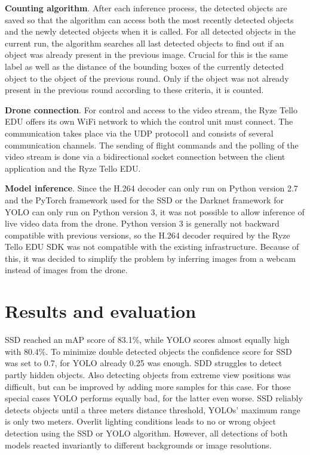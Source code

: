 \documentclass[a4paper, 10pt, journal]{wissarbIEEE}      %
\begin{document}
\textbf{Counting algorithm}. After each inference process, the detected objects are saved so that the algorithm can access both the most recently detected objects and the newly detected objects when it is called. For all detected objects in the current run, the algorithm searches all last detected objects to find out if an object was already present in the previous image. Crucial for this is the same label as well as the distance of the bounding boxes of the currently detected object to the object of the previous round. Only if the object was not already present in the previous round according to these criteria, it is counted.

\textbf{Drone connection}. For control and access to the video stream, the Ryze Tello EDU offers its own WiFi network to which the control unit must connect. The communication takes place via the UDP protocol1 and consists of several communication channels. The sending of flight commands and the polling of the video stream is done via a bidirectional socket connection between the client application and the Ryze Tello EDU.

\textbf{Model inference}. Since the H.264 decoder can only run on Python version 2.7 and the PyTorch framework used for the SSD or the Darknet framework for YOLO can only run on Python version 3, it was not possible to allow inference of live video data from the drone. Python version 3 is generally not backward compatible with previous versions, so the H.264 decoder required by the Ryze Tello EDU SDK was not compatible with the existing infrastructure. Because of this, it was decided to simplify the problem by inferring images from a webcam instead of images from the drone.

\section{Results and evaluation} \label{evaluation}

SSD reached an mAP score of 83.1\%, while YOLO scores almost equally high with 80.4\%. To minimize double detected objects the confidence score for SSD was set to 0.7, for YOLO already 0.25 was enough. SDD struggles to detect partly hidden objects. Also detecting objects from extreme view positions was difficult, but can be improved by adding more samples for this case. For those special cases YOLO performs equally bad, for the latter even worse. SSD reliably detects objects until a three meters distance threshold, YOLOs' maximum range is only two meters. Overlit lighting conditions leads to no or wrong object detection using the SSD or YOLO algorithm. However, all detections of both models reacted invariantly to different backgrounds or image resolutions. 
\end{document}
